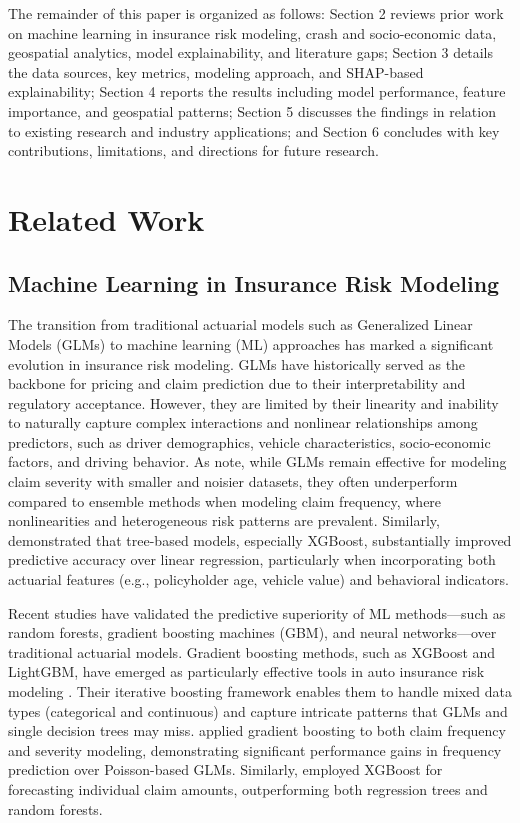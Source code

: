 \documentclass[
  number,
  review,
  3p]{elsarticle}
\begin{document}
The remainder of this paper is organized as follows: Section 2 reviews
prior work on machine learning in insurance risk modeling, crash and
socio-economic data, geospatial analytics, model explainability, and
literature gaps; Section 3 details the data sources, key metrics,
modeling approach, and SHAP-based explainability; Section 4 reports the
results including model performance, feature importance, and geospatial
patterns; Section 5 discusses the findings in relation to existing
research and industry applications; and Section 6 concludes with key
contributions, limitations, and directions for future research.

\section{Related Work}\label{related-work}

\subsection{\texorpdfstring{\textbf{Machine Learning in Insurance Risk
Modeling}}{Machine Learning in Insurance Risk Modeling}}\label{machine-learning-in-insurance-risk-modeling}

The transition from traditional actuarial models such as Generalized
Linear Models (GLMs) to machine learning (ML) approaches has marked a
significant evolution in insurance risk modeling. GLMs have historically
served as the backbone for pricing and claim prediction due to their
interpretability and regulatory acceptance. However, they are limited by
their linearity and inability to naturally capture complex interactions
and nonlinear relationships among predictors, such as driver
demographics, vehicle characteristics, socio-economic factors, and
driving behavior. As \citet{clemente} note, while GLMs remain effective
for modeling claim severity with smaller and noisier datasets, they
often underperform compared to ensemble methods when modeling claim
frequency, where nonlinearities and heterogeneous risk patterns are
prevalent. Similarly, \citet{jonkheijm} demonstrated that tree-based
models, especially XGBoost, substantially improved predictive accuracy
over linear regression, particularly when incorporating both actuarial
features (e.g., policyholder age, vehicle value) and behavioral
indicators.

Recent studies have validated the predictive superiority of ML
methods---such as random forests, gradient boosting machines (GBM), and
neural networks---over traditional actuarial models. Gradient boosting
methods, such as XGBoost and LightGBM, have emerged as particularly
effective tools in auto insurance risk modeling \citep{henckaerts}.
Their iterative boosting framework enables them to handle mixed data
types (categorical and continuous) and capture intricate patterns that
GLMs and single decision trees may miss. \citet{clemente} applied
gradient boosting to both claim frequency and severity modeling,
demonstrating significant performance gains in frequency prediction over
Poisson-based GLMs. Similarly, \citet{jonkheijm} employed XGBoost for
forecasting individual claim amounts, outperforming both regression
trees and random forests.
\end{document}
